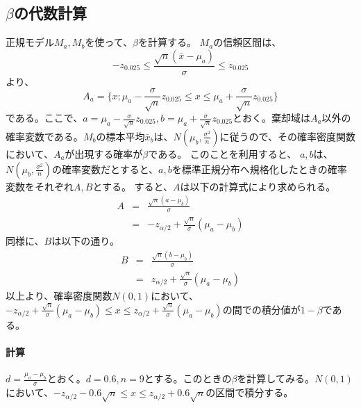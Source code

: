 \subsection{$\beta$の代数計算}
正規モデル$M_a,M_b$を使って、$\beta$を計算する。
$M_a$の信頼区間は、
\begin{equation*}
    -z_{0.025}\leq \frac{\sqrt{n}(\bar{x}-\mu_a)}{\sigma}\leq z_{0.025}
\end{equation*}
より、
\begin{equation*}
    A_a = \{ x ; \mu_a -\frac{\sigma}{\sqrt{n}}z_{0.025} \leq x \leq \mu_a +\frac{\sigma}{\sqrt{n}}z_{0.025} \}
\end{equation*}
である。ここで、$a=\mu_a -\frac{\sigma}{\sqrt{n}}z_{0.025},b = \mu_a +\frac{\sigma}{\sqrt{n}}z_{0.025} $とおく。棄却域は$A_a$以外の確率変数である。$M_b$の標本平均$\bar{x}_b$は、$N(\mu_b,\frac{\sigma^2}{n})$に従うので、その確率密度関数において、$A_a$が出現する確率が$\beta$である。
このことを利用すると、
$a,b$は、$N(\mu_b,\frac{\sigma^2}{n})$の確率変数だとすると、$a,b$を標準正規分布へ規格化したときの確率変数をそれぞれ$A,B$とする。
すると、$A$は以下の計算式により求められる。
\begin{eqnarray*}
    A &=& \frac{\sqrt{n}(a-\mu_b)}{\sigma} \\
    &=& -z_{\alpha/2}+\frac{\sqrt{n}}{\sigma}(\mu_a-\mu_b)
\end{eqnarray*}
同様に、$B$は以下の通り。
\begin{eqnarray*}
    B &=& \frac{\sqrt{n}(b-\mu_b)}{\sigma} \\
    &=& z_{\alpha/2}+\frac{\sqrt{n}}{\sigma}(\mu_a-\mu_b)
\end{eqnarray*}
以上より、確率密度関数$N(0,1)$において、$-z_{\alpha/2}+\frac{\sqrt{n}}{\sigma}(\mu_a-\mu_b) \leq x\leq  z_{\alpha/2}+\frac{\sqrt{n}}{\sigma}(\mu_a-\mu_b)$の間での積分値が$1-\beta$である。


\paragraph{計算}

$d=\frac{\mu_a-\mu_b}{\sigma}$とおく。$d=0.6,n=9$とする。このときの$\beta$を計算してみる。$N(0,1)$において、$-z_{\alpha/2} -0.6\sqrt{n} \leq x \leq z_{\alpha/2} +0.6\sqrt{n}$の区間で積分する。


